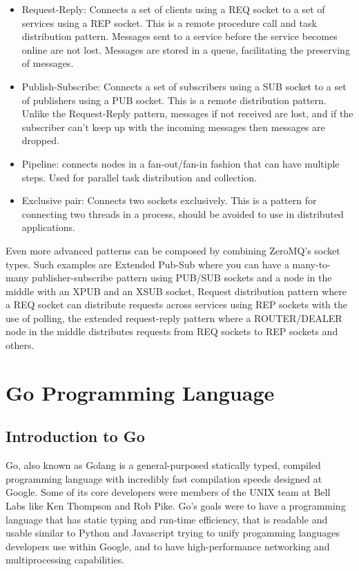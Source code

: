 \documentclass[12pt,a4paper]{report}
\begin{document}
				\begin{itemize}
					\item Request-Reply: Connects a set of clients using a REQ socket to a set of services using a REP socket. This is a remote procedure call 					and task distribution pattern. Messages sent to a service before the service becomes online are not lost. Messages are stored in a queue, 
					facilitating the preserving of messages.
					\item Publish-Subscribe: Connects a set of subscribers using a SUB socket to a set of publishers using a PUB socket. This is a remote 
					distribution pattern. Unlike the Request-Reply pattern, messages if not received are lost, and if the subscriber can't keep up with the 
					incoming messages then messages are dropped.
					\item Pipeline: connects nodes in a fan-out/fan-in fashion that can have multiple steps. Used for parallel task distribution and 
					collection.
					\item Exclusive pair: Connects two sockets exclusively. This is a pattern for connecting two threads in a process, should be avoided to 
					use in distributed applications.
				\end{itemize}
		Even more advanced patterns can be composed by combining ZeroMQ's socket types. Such examples are Extended Pub-Sub where you can have a many-to-many
		publisher-subscribe pattern using PUB/SUB sockets and a node in the middle with an XPUB and an XSUB socket, Request distribution pattern where a REQ 
		socket can distribute requests across services using REP sockets with the use of polling, the extended request-reply pattern where a ROUTER/DEALER 
		node in the middle distributes requests from REQ sockets to REP sockets and others.
		
		\section{Go Programming Language}
		\subsection{Introduction to Go}
		Go, also known as Golang is a general-purposed statically typed, compiled programming language with incredibly fast compilation speeds
		designed at Google. 
		Some of its core developers were members of the UNIX team at Bell Labs like Ken Thompson and Rob Pike.
		Go's goals were to have a programming language that has static typing and run-time efficiency, that is readable and usable similar to Python and 
		Javascript trying to unify progamming languages developers use within Google, and to have high-performance networking and multiprocessing 
		capabilities.
		
\end{document}
